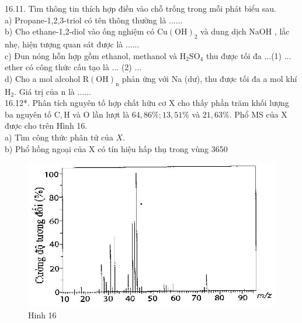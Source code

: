 \documentclass[10pt]{article}
\begin{document}
16.11. Tìm thông tin thích hợp điền vào chỗ trống trong mỗi phát biểu sau.\\
a) Propane-1,2,3-triol có tên thông thường là ......\\
b) Cho ethane-1,2-diol vào ống nghiệm có $\mathrm{Cu}(\mathrm{OH})_{2}$ và dung dịch NaOH , lắc nhẹ, hiện tượng quan sát được là ......\\
c) Đun nóng hỗn hợp gồm ethanol, methanol và $\mathrm{H}_{2} \mathrm{SO}_{4}$ thu được tối đa ...(1) ... ether có công thức cấu tạo là ... (2) ...\\
d) Cho a mol alcohol $\mathrm{R}(\mathrm{OH})_{\mathrm{n}}$ phản ứng với Na (dư), thu được tối đa a mol khí $\mathrm{H}_{2}$. Giá trị của n là ......\\
16.12*. Phân tích nguyên tố hợp chất hữu cơ X cho thấy phần trăm khối lượng ba nguyên tố $\mathrm{C}, \mathrm{H}$ và O lần lượt là $64,86 \% ; 13,51 \%$ và $21,63 \%$. Phổ MS của X được cho trên Hình 16.\\
a) Tìm công thức phân tử của $X$.\\
b) Phổ hồng ngoại của X có tín hiệu hấp thụ trong vùng 3650

\begin{figure}[h]
\begin{center}
  \includegraphics[width=\textwidth]{2025_10_23_f2823ef970776205e47bg-50}
\captionsetup{labelformat=empty}
\caption{Hinh 16}
\end{center}
\end{figure}
\end{document}
